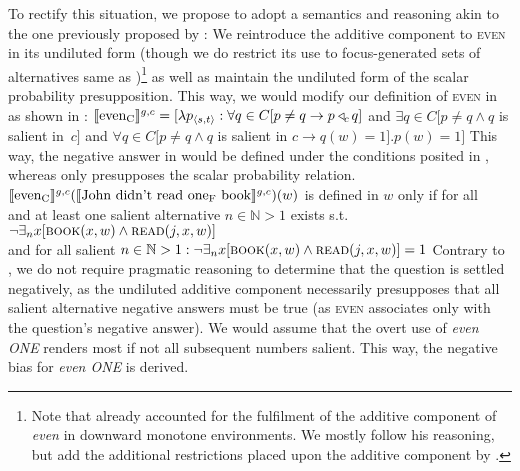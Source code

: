 To rectify this situation, we propose to adopt a semantics and reasoning akin to the one previously proposed by \textcite{Jeong2021,Jeong2022}: We reintroduce the additive component to {\scshape even} in its undiluted form (though we do restrict its use to focus-generated sets of alternatives same as \textcite{Jeong2021,Jeong2022})\footnote{Note that \textcite{Crnic2011,Crnic2014-dogma,Crnic2014-nm} already accounted for the fulfilment of the additive component of \textit{even} in downward monotone environments. We mostly follow his reasoning, but add the additional restrictions placed upon the additive component by \textcite{Jeong2021,Jeong2022}.} as well as maintain the undiluted form of the scalar probability presupposition. This way, we would modify our definition of {\scshape even} in  as shown in :
\ex{}
$\intension[g,c]{even\textsubscript{C}}=[\lambda{p_{\langle s,t\rangle}}:\forall{q\in C}[p\neq q\rightarrow p\lprob\hspace{-1mm}_c\hspace{0.5mm} q]$ and $\exists{q\in C}[p\neq q\land q$ is salient in~$c]$ and $\forall{q\in C}[p\neq q\land q$ is salient in $c\rightarrow q(w)=1].p(w)=1]$
\xe
This way, the negative answer in  would be defined under the conditions posited in , whereas  only presupposes the scalar probability relation.
\ex{}
$\intension[g,c]{even\textsubscript{C}}(\intension[g,c]{John didn't read one\textsubscript{F} book})(w)$ is defined in $w$ only if for all\linebreak{}\\%
and at least one salient alternative $n\in\mathbb{N}>1$ exists s.t.\\%
$\neg\exists_n{x}[\predicate{book}(x,w)\land\predicate{read}(j,x,w)]$\\%
and for all salient $n\in\mathbb{N}>1:\neg\exists_n{x}[\predicate{book}(x,w)\land\predicate{read}(j,x,w)]=1$ 
\xe
Contrary to \textcite{Jeong2021,Jeong2022}, we do not require pragmatic reasoning to determine that the question is settled negatively, as the undiluted additive component necessarily presupposes that all salient alternative negative answers must be true (as {\scshape even} associates only with the question's negative answer). We would assume that the overt use of \textit{even \MakeUppercase{one}} renders most if not all subsequent numbers salient. This way, the negative bias for \textit{even \MakeUppercase{one}} is derived. 

